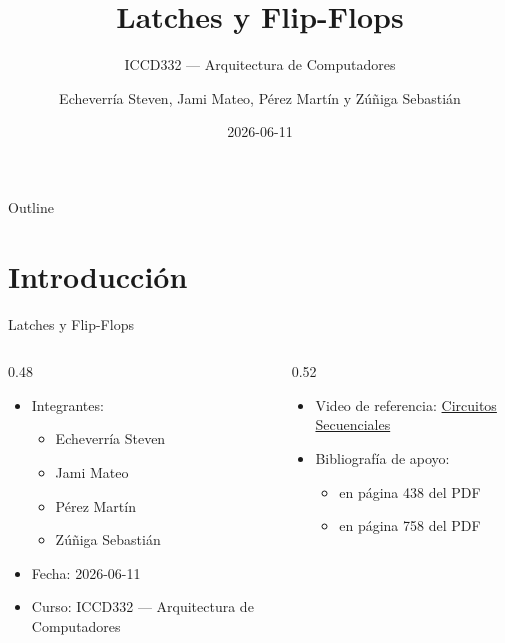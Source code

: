 \documentclass[presentation]{beamer}
\author{Echeverría Steven, Jami Mateo, Pérez Martín y Zúñiga Sebastián}
\date{2026-06-11}
\title{Latches y Flip-Flops}
\subtitle{ICCD332 — Arquitectura de Computadores}
\begin{document}
\maketitle
\begin{frame}{Outline}
\tableofcontents
\end{frame}


\section{Introducción}
\label{sec:org52c943c}

\begin{frame}[label={sec:orga4571a3}]{Latches y Flip-Flops}
\begin{columns}
\begin{column}{0.48\columnwidth}
\begin{itemize}
\item \alert{Integrantes:}
\begin{itemize}
\item Echeverría Steven
\item Jami Mateo
\item Pérez Martín
\item Zúñiga Sebastián
\end{itemize}
\item \alert{Fecha:} 2026-06-11
\item \alert{Curso:} ICCD332 — Arquitectura de Computadores
\end{itemize}
\end{column}

\begin{column}{0.52\columnwidth}
\begin{itemize}
\item \alert{Video de referencia:}
\href{https://youtu.be/JEPmmHYD\_Ss?si=GWVx3Kj8el1FyktM}{Circuitos Secuenciales}

\item \alert{Bibliografía de apoyo:}
\begin{itemize}
\item \autocite{stallings2022eng} en página 438 del PDF

\item \autocite{stallings2006esp} en página 758 del PDF
\end{itemize}
\end{itemize}
\end{column}
\end{columns}
\end{frame}
\end{document}
